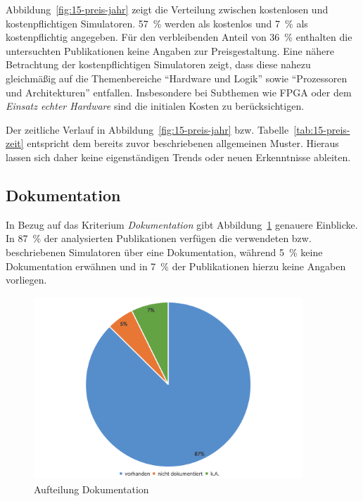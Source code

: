 Abbildung~\ref{fig:15-preis-jahr} zeigt die Verteilung zwischen kostenlosen und kostenpflichtigen Simulatoren. 57~\% werden als kostenlos und 7~\% als kostenpflichtig angegeben. Für den verbleibenden Anteil von 36~\% enthalten die untersuchten Publikationen keine Angaben zur Preisgestaltung. Eine nähere Betrachtung der kostenpflichtigen Simulatoren zeigt, dass diese nahezu gleichmäßig auf die Themenbereiche \enquote{Hardware und Logik} sowie \enquote{Prozessoren und Architekturen} entfallen. Insbesondere bei Subthemen wie \ac{FPGA} oder dem \textit{Einsatz echter Hardware} sind die initialen Kosten zu berücksichtigen.

Der zeitliche Verlauf in Abbildung~\ref{fig:15-preis-jahr} bzw. Tabelle~\ref{tab:15-preis-zeit} entspricht dem bereits zuvor beschriebenen allgemeinen Muster. Hieraus lassen sich daher keine eigenständigen Trends oder neuen Erkenntnisse ableiten.

\subsection{Dokumentation}

In Bezug auf das Kriterium \textit{Dokumentation} gibt Abbildung~\ref{fig:16-dokumentation} genauere Einblicke. In 87~\% der analysierten Publikationen verfügen die verwendeten bzw. beschriebenen Simulatoren über eine Dokumentation, während 5~\% keine Dokumentation erwähnen und in 7~\% der Publikationen hierzu keine Angaben vorliegen.

\begin{figure}[!htbp]
    \centering
    \caption{Aufteilung Dokumentation}
    \label{fig:16-dokumentation}
    \includegraphics[width=0.90\textwidth]{graphics_lit/16-dokumentation.png}
\end{figure}


